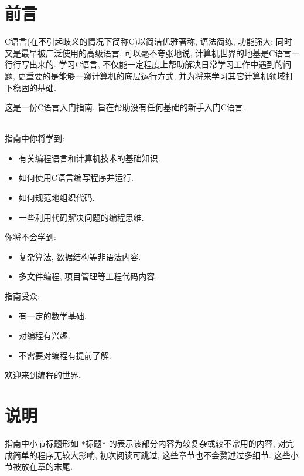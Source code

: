 \chapter*{前言}
 \label{前言}

    C语言(在不引起歧义的情况下简称C)以简洁优雅著称, 语法简练, 功能强大; 同时又是最早被广泛使用的高级语言, 可以毫不夸张地说, 计算机世界的地基是C语言一行行写出来的. 学习C语言, 不仅能一定程度上帮助解决日常学习工作中遇到的问题, 更重要的是能够一窥计算机的底层运行方式, 并为将来学习其它计算机领域打下稳固的基础.

    这是一份C语言入门指南. 旨在帮助没有任何基础的新手入门C语言.

    \leavevmode \\
    指南中你将学到:
    \begin{itemize}
        \item 有关编程语言和计算机技术的基础知识.
        \item 如何使用C语言编写程序并运行.
        \item 如何规范地组织代码.
        \item 一些利用代码解决问题的编程思维.
    \end{itemize}

    \noindent
    你将不会学到:
    \begin{itemize}
        \item 复杂算法, 数据结构等非语法内容.
        \item 多文件编程, 项目管理等工程代码内容.
    \end{itemize}

    \noindent
    指南受众:
    \begin{itemize}
        \item 有一定的数学基础.
        \item 对编程有兴趣.
        \item 不需要对编程有提前了解.
    \end{itemize}

    \vspace*{5pt}

    欢迎来到编程的世界.

\chapter*{说明}
 \label{说明}

    指南中小节标题形如 \texttt{*}标题\texttt{*} 的表示该部分内容为较复杂或较不常用的内容, 对完成简单的程序无较大影响, 初次阅读可跳过, 这些章节也不会赘述过多细节. 这些小节被放在章的末尾.

